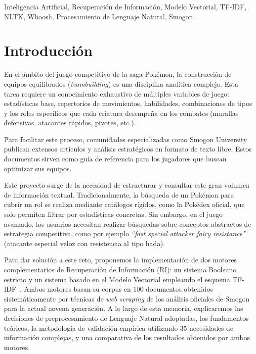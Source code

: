 \documentclass[conference,a4paper]{IEEEtran}
\begin{document}
\begin{IEEEkeywords}
  Inteligencia Artificial, Recuperación de Información, Modelo Vectorial, TF-IDF, NLTK, Whoosh, Procesamiento de Lenguaje Natural, Smogon.
\end{IEEEkeywords}

\section{Introducción}

En el ámbito del juego competitivo de la saga Pokémon, la construcción de equipos equilibrados (\emph{teambuilding}) es una disciplina analítica compleja. Esta tarea requiere un conocimiento exhaustivo de múltiples variables de juego: estadísticas base, repertorios de movimientos, habilidades, combinaciones de tipos y los roles específicos que cada criatura desempeña en los combates (murallas defensivas, atacantes rápidos, pivotes, etc.).

Para facilitar este proceso, comunidades especializadas como Smogon University~\cite{b1} publican extensos artículos y análisis estratégicos en formato de texto libre. Estos documentos sirven como guía de referencia para los jugadores que buscan optimizar sus equipos.

Este proyecto surge de la necesidad de estructurar y consultar este gran volumen de información textual. Tradicionalmente, la búsqueda de un Pokémon para cubrir un rol se realiza mediante catálogos rígidos, como la Pokédex oficial, que solo permiten filtrar por estadísticas concretas. Sin embargo, en el juego avanzado, los usuarios necesitan realizar búsquedas sobre conceptos abstractos de estrategia competitiva, como por ejemplo \emph{``fast special attacker fairy resistance''} (atacante especial veloz con resistencia al tipo hada).

Para dar solución a este reto, proponemos la implementación de dos motores complementarios de Recuperación de Información (RI): un sistema Booleano estricto y un sistema basado en el Modelo Vectorial empleando el esquema TF-IDF~\cite{b2}. Ambos motores basan su corpus en 100 documentos obtenidos sistemáticamente por técnicas de \emph{web scraping} de los análisis oficiales de Smogon para la actual novena generación. A lo largo de esta memoria, explicaremos las decisiones de preprocesamiento de Lenguaje Natural adoptadas, los fundamentos teóricos, la metodología de validación empírica utilizando 35 necesidades de información complejas, y una comparativa de los resultados obtenidos por ambos motores.
\end{document}
